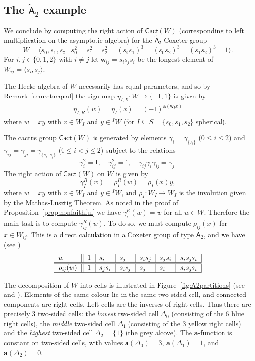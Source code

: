 \documentclass[11pt]{article}
\theoremstyle{plain}
\theoremstyle{definition}
\numberwithin{equation}{section}
\def\cact{\mathsf{Cact}}
\def\sA{\mathsf{A}}
\newcommand{\sw}{\mathsf{w}}
\newcommand{\ba}{\mathbf{a}}
\begin{document}
\subsection{The $\tilde{\sA}_2$ example}\label{sec:example}

We conclude by computing the right action of $\cact(W)$ (corresponding to left multiplication on the asymptotic algebra) for the $\tilde{\sA}_2$ Coxeter group 
$$
W=\langle s_0,s_1,s_2\mid s_0^2=s_1^2=s_2^2=(s_0s_1)^3=(s_0s_2)^3=(s_1s_2)^3=1\rangle.
$$
For $i,j\in\{0,1,2\}$ with $i\neq j$ let $\sw_{ij}=s_is_js_i$ be the longest element of $W_{ij}=\langle s_i,s_j\rangle$. 

The Hecke algebra of $W$ necessarily has equal parameters, and so by Remark~\ref{rem:etaequal} the sign map $\eta_{I,R}:W\to\{-1,1\}$ is given by
\begin{align}\label{eq:signs}
\eta_{I,R}(w)=\eta_I(x)=(-1)^{\ba(\sw_I x)}
\end{align}
where $w=xy$ with $x\in W_I$ and $y\in{^I}W$ (for $I\subseteq S=\{s_0,s_1,s_2\}$ spherical). 





The cactus group $\cact(W)$ is generated by elements $\gamma_i=\gamma_{\{s_i\}}$ ($0\leq i\leq 2$) and $\gamma_{ij}=\gamma_{ji}=\gamma_{\{s_i,s_j\}}$ ($0\leq i< j\leq 2$) subject to the relations 
$$
\gamma_i^2=1,\quad 
\gamma_{ij}^2=1,\quad\gamma_{ij}\gamma_i\gamma_{ij}=\gamma_j.
$$
The right action of $\cact(W)$ on $W$ is given by 
$$
\gamma_I^R(w)=\rho_I^R(w)=\rho_I(x)y,
$$
where $w=xy$ with $x\in W_I$ and $y\in {^I}W$, and $\rho_I:W_I\to W_I$ is the involution given by the Mathas-Lusztig Theorem. As noted in the proof of Proposition~\ref{prop:nonfaithful} we have $\gamma_i^R(w)=w$ for all $w\in W$. Therefore the main task is to compute $\gamma_{ij}^R(w)$. To do so, we must compute $\rho_{ij}(x)$ for $x \in W_{ij}$. This is a direct calculation in a Coxeter group of type $\sA_2$, and we have (see \cite[Proposition~6.5]{Bon:16})
\begin{align}\label{eq:paraboliccalculation}
\begin{tabular}{l||l|l|l|l|l|l|}
$w$&$1$&$s_i$&$s_j$&$s_is_j$&$s_js_i$&$s_is_js_i$\\
\hline\hline
$\rho_{ij}(w)$&$1$&$s_js_i$&$s_is_j$&$s_j$&$s_i$&$s_is_js_i$\\
\hline
\end{tabular}
\end{align}


The decomposition of $W$ into cells is illustrated in Figure~\ref{fig:A2partitions} (see \cite{Lus:I} and \cite[Chapter~23]{Bon:17}). Elements of the same colour lie in the same two-sided cell, and connected components are right cells. Left cells are the inverses of right cells. Thus there are precisely $3$ two-sided cells: the \textit{lowest} two-sided cell $\Delta_0$ (consisting of the 6 blue right cells), the \textit{middle} two-sided cell $\Delta_1$ (consisting of the $3$ yellow right cells) and the \textit{highest} two-sided cell $\Delta_2=\{1\}$ (the grey alcove). The $\ba$-function is constant on two-sided cells, with values $\ba(\Delta_0)=3$, $\ba(\Delta_1)=1$, and $\ba(\Delta_2)=0$. 
\end{document}
